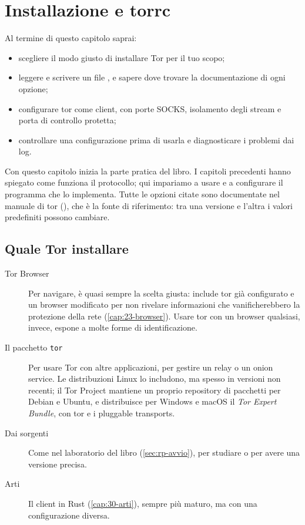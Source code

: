 \chapter{Installazione e torrc}\label{cap:17-torrc}

\begin{obiettivi}
Al termine di questo capitolo saprai:
\begin{itemize}[nosep]
  \item scegliere il modo giusto di installare Tor per il tuo scopo;
  \item leggere e scrivere un file , e sapere dove trovare la documentazione di ogni opzione;
  \item configurare tor come client, con porte SOCKS, isolamento degli stream e porta di controllo protetta;
  \item controllare una configurazione prima di usarla e diagnosticare i problemi dai log.
\end{itemize}
\end{obiettivi}

Con questo capitolo inizia la parte pratica del libro. I capitoli precedenti hanno spiegato come funziona il protocollo; qui impariamo a usare e a configurare il programma che lo implementa. Tutte le opzioni citate sono documentate nel manuale di tor (), che è la fonte di riferimento: tra una versione e l'altra i valori predefiniti possono cambiare.

\section{Quale Tor installare}\label{sec:torrc-installare}

\begin{description}
  \item[Tor Browser] Per navigare, è quasi sempre la scelta giusta: include tor già configurato e un browser modificato per non rivelare informazioni che vanificherebbero la protezione della rete (\cref{cap:23-browser}). Usare tor con un browser qualsiasi, invece, espone a molte forme di identificazione.
  \item[Il pacchetto \texttt{tor}] Per usare Tor con altre applicazioni, per gestire un relay o un onion service. Le distribuzioni Linux lo includono, ma spesso in versioni non recenti; il Tor Project mantiene un proprio repository di pacchetti per Debian e Ubuntu, e distribuisce per Windows e macOS il \emph{Tor Expert Bundle}, con tor e i pluggable transports.
  \item[Dai sorgenti] Come nel laboratorio del libro (\cref{sec:rp-avvio}), per studiare o per avere una versione precisa.
  \item[Arti] Il client in Rust (\cref{cap:30-arti}), sempre più maturo, ma con una configurazione diversa.
\end{description}

